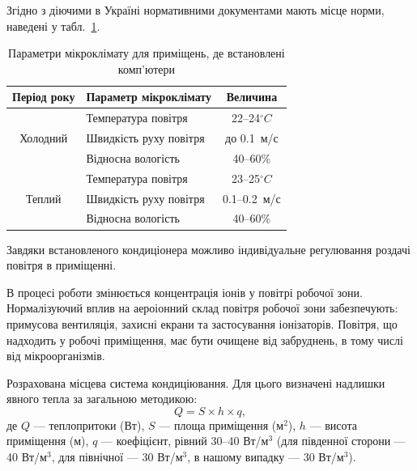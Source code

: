 \documentclass[simple,14pt,utf8,ukrainian]{eskdtext}
\begin{document}
      Згідно з діючими в Україні нормативними документами\cite{gost121005}
      мають місце норми, наведені у табл.~\ref{tab:microclimat}.
      \begin{table}[h]
        \centering
        \begin{tabular}{|c|l|c|}
          \hline
            Період року & Параметр мікроклімату & Величина\\
          \hline
            \multirow{3}{*}{Холодний} & Температура повітря &
            \num{22}--\num{24}$^\circ C$\\
          \cline{2-3}
            & Швидкість руху повітря & до \num{0.1}~м/с\\
          \cline{2-3}
            & Відносна вологість & \num{40}--\num{60}\%\\
          \hline
            \multirow{3}{*}{Теплий} & Температура повітря &
            \num{23}--\num{25}$^\circ C$\\
          \cline{2-3}
            & Швидкість руху повітря & \num{0.1}--\num{0.2}~м/с\\
          \cline{2-3}
            & Відносна вологість & \num{40}--\num{60}\%\\
          \hline
        \end{tabular}
        \caption{Параметри мікроклімату для приміщень, де встановлені
        комп’ютери}
        \label{tab:microclimat}
      \end{table}

      Завдяки встановленого кондиціонера можливо індивідуальне регулювання
      роздачі повітря в приміщенні.

      В процесі роботи змінюється концентрація іонів у повітрі робочої зони.
      Нормалізуючий вплив на аероіонний склад повітря робочої зони
      забезпечують: примусова вентиляція, захисні екрани та застосування
      іонізаторів.
      Повітря, що надходить у робочі приміщення, має бути очищене від
      забруднень, в тому числі від мікроорганізмів.

      Розрахована місцева система кондиціювання. Для цього визначені надлишки
      явного тепла за загальною методикою:
      \begin{equation}
        Q = S \times h \times q,
        \label{eq:nadlishki}
      \end{equation}
      де $Q$ --- теплопритоки (Вт), $S$ --- площа приміщення (м$^2$), $h$ ---
      висота приміщення (м), $q$ --- коефіцієнт, рівний \num{30}--\num{40}
      Вт/м$^3$ (для південної сторони --- 40 Вт/м$^3$, для північної --- 30
      Вт/м$^3$, в нашому випадку --- 30 Вт/м$^3$).
\end{document}
